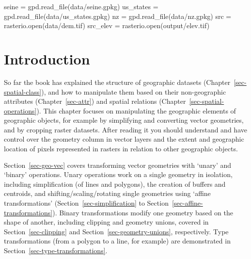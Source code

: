 \documentclass[
  letterpaper,
]{krantz}
\newenvironment{Shaded}{\begin{snugshade}}{\end{snugshade}}
\newcommand{\BuiltInTok}[1]{\textcolor[rgb]{0.00,0.23,0.31}{#1}}
\newcommand{\NormalTok}[1]{\textcolor[rgb]{0.00,0.23,0.31}{#1}}
\newcommand{\OperatorTok}[1]{\textcolor[rgb]{0.37,0.37,0.37}{#1}}
\newcommand{\StringTok}[1]{\textcolor[rgb]{0.13,0.47,0.30}{#1}}
\begin{document}
\begin{Shaded}
\begin{Highlighting}[]
\NormalTok{seine }\OperatorTok{=}\NormalTok{ gpd.read\_file(}\StringTok{\textquotesingle{}data/seine.gpkg\textquotesingle{}}\NormalTok{)}
\NormalTok{us\_states }\OperatorTok{=}\NormalTok{ gpd.read\_file(}\StringTok{\textquotesingle{}data/us\_states.gpkg\textquotesingle{}}\NormalTok{)}
\NormalTok{nz }\OperatorTok{=}\NormalTok{ gpd.read\_file(}\StringTok{\textquotesingle{}data/nz.gpkg\textquotesingle{}}\NormalTok{)}
\NormalTok{src }\OperatorTok{=}\NormalTok{ rasterio.}\BuiltInTok{open}\NormalTok{(}\StringTok{\textquotesingle{}data/dem.tif\textquotesingle{}}\NormalTok{)}
\NormalTok{src\_elev }\OperatorTok{=}\NormalTok{ rasterio.}\BuiltInTok{open}\NormalTok{(}\StringTok{\textquotesingle{}output/elev.tif\textquotesingle{}}\NormalTok{)}
\end{Highlighting}
\end{Shaded}

\section{Introduction}\label{introduction-3}

So far the book has explained the structure of geographic datasets
(Chapter~\ref{sec-spatial-class}), and how to manipulate them based on
their non-geographic attributes (Chapter~\ref{sec-attr}) and spatial
relations (Chapter~\ref{sec-spatial-operations}). This chapter focuses
on manipulating the geographic elements of geographic objects, for
example by simplifying and converting vector geometries, and by cropping
raster datasets. After reading it you should understand and have control
over the geometry column in vector layers and the extent and geographic
location of pixels represented in rasters in relation to other
geographic objects.

Section~\ref{sec-geo-vec} covers transforming vector geometries with
`unary' and `binary' operations. Unary operations work on a single
geometry in isolation, including simplification (of lines and polygons),
the creation of buffers and centroids, and shifting/scaling/rotating
single geometries using `affine transformations'
(Section~\ref{sec-simplification} to
Section~\ref{sec-affine-transformations}). Binary transformations modify
one geometry based on the shape of another, including clipping and
geometry unions, covered in Section~\ref{sec-clipping} and
Section~\ref{sec-geometry-unions}, respectively. Type transformations
(from a polygon to a line, for example) are demonstrated in
Section~\ref{sec-type-transformations}.
\end{document}
